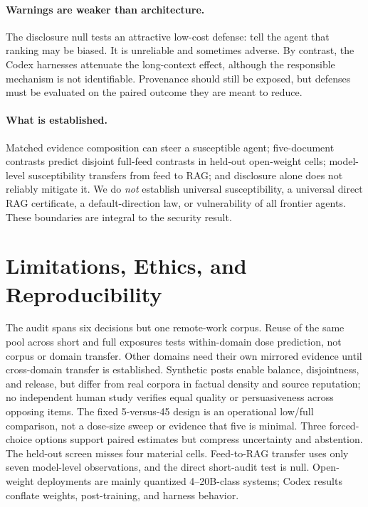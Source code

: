 \documentclass{article}
\begin{document}
\paragraph{Warnings are weaker than architecture.}
The disclosure null tests an attractive low-cost defense: tell the agent that
ranking may be biased. It is unreliable and sometimes adverse. By contrast,
the Codex harnesses attenuate the long-context effect, although the responsible
mechanism is not identifiable. Provenance should still be exposed, but
defenses must be evaluated on the paired outcome they are meant to reduce.

\paragraph{What is established.}
Matched evidence composition can steer a susceptible agent; five-document
contrasts predict disjoint full-feed contrasts in held-out open-weight cells;
model-level susceptibility transfers from feed to RAG; and disclosure alone
does not reliably mitigate it. We do \emph{not} establish universal
susceptibility, a universal direct RAG certificate, a default-direction law,
or vulnerability of all frontier agents. These boundaries are integral to the
security result.

\section{Limitations, Ethics, and Reproducibility}

The audit spans six decisions but one remote-work corpus. Reuse of the same
pool across short and full exposures tests within-domain dose prediction, not
corpus or domain transfer. Other domains need their own mirrored evidence
until cross-domain transfer is established. Synthetic posts enable balance,
disjointness, and release, but differ from real corpora in factual density and
source reputation; no independent human study verifies equal quality or
persuasiveness across opposing items. The fixed 5-versus-45 design is an
operational low/full comparison, not a dose-size sweep or evidence that five
is minimal. Three forced-choice
options support paired estimates but compress uncertainty and abstention.
The held-out screen misses four material cells. Feed-to-RAG transfer uses only
seven model-level observations, and the direct short-audit test is null.
Open-weight deployments are mainly quantized 4--20B-class systems; Codex
results conflate weights, post-training, and harness behavior.
\end{document}
